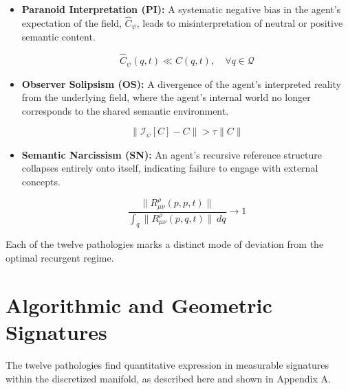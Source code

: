 \begin{itemize}

    \item \textbf{Paranoid Interpretation (PI):} A systematic negative bias in the agent's expectation of the field, \(\hat{C}_{\psi}\), leads to misinterpretation of neutral or positive semantic content.
    
    \begin{equation}
    \hat{C}_{\psi}(q,t) \ll C(q,t), \quad \forall q \in \mathcal{Q}
    \end{equation}

    \item \textbf{Observer Solipsism (OS):} A divergence of the agent's interpreted reality from the underlying field, where the agent's internal world no longer corresponds to the shared semantic environment.
    
    \begin{equation}
    \|\mathcal{I}_{\psi}[C] - C\| > \tau \|C\|
    \end{equation}

    \item \textbf{Semantic Narcissism (SN):} An agent's recursive reference structure collapses entirely onto itself, indicating failure to engage with external concepts.
    
    \begin{equation}
    \frac{\|R^\rho_{\mu\nu}(p,p,t)\|}{\int_q \|R^\rho_{\mu\nu}(p,q,t)\| \, dq} \to 1
    \end{equation}

\end{itemize}

Each of the twelve pathologies marks a distinct mode of deviation from the optimal recurgent regime.


\section{Algorithmic and Geometric Signatures}
\label{16.3:algorithmic_and_geometric_signatures}

The twelve pathologies find quantitative expression in measurable signatures within the discretized manifold, as described here and shown in Appendix A.



